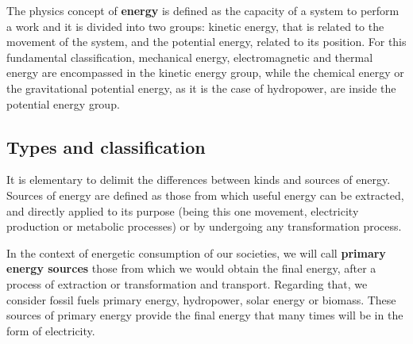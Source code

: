 The physics concept of \textbf{energy} is defined as the capacity of a system to perform a work and it is divided into two groups: kinetic energy, that is related to the movement of the system, and the potential energy, related to its position. For this fundamental classification, mechanical energy, electromagnetic and thermal energy are encompassed in the kinetic energy group, while the chemical energy or the gravitational potential energy, as it is the case of hydropower,  are inside the potential energy group.

\subsection{Types and classification}


It is elementary to delimit the differences between kinds and sources of energy. Sources of energy are defined as those from which useful energy can be extracted, and directly applied to its purpose (being this one movement, electricity production or metabolic processes) or by undergoing any transformation process.


In the context of energetic consumption of our societies, we will call \textbf{primary energy sources} those from which we would obtain the final energy, after a process of extraction or transformation and transport. Regarding that, we consider fossil fuels primary energy, hydropower, solar energy or biomass. These sources of primary energy provide the final energy that many times will be in the form of electricity. 

